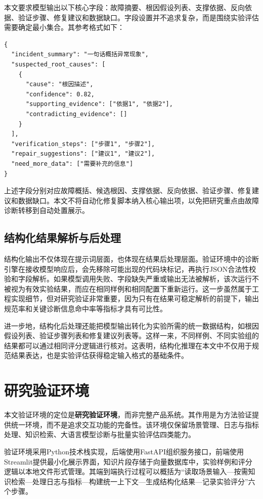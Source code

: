 本文要求模型输出以下核心字段：故障摘要、根因假设列表、支撑依据、反向依据、验证步骤、修复建议和数据缺口。字段设置并不追求复杂，而是围绕实验评估需要确定最小集合。其参考格式如下：

\begin{verbatim}
{
  "incident_summary": "一句话概括异常现象",
  "suspected_root_causes": [
    {
      "cause": "根因描述",
      "confidence": 0.82,
      "supporting_evidence": ["依据1", "依据2"],
      "contradicting_evidence": []
    }
  ],
  "verification_steps": ["步骤1", "步骤2"],
  "repair_suggestions": ["建议1", "建议2"],
  "need_more_data": ["需要补充的信息"]
}
\end{verbatim}

\noindent 上述字段分别对应故障概括、候选根因、支撑依据、反向依据、验证步骤、修复建议和数据缺口。本文不将自动化修复脚本纳入核心输出项，以免把研究重点由故障诊断转移到自动处置展示。

\subsection{结构化结果解析与后处理}

结构化输出不仅体现在提示词层面，也体现在结果后处理层面。验证环境中的诊断引擎在接收模型响应后，会先移除可能出现的代码块标记，再执行JSON合法性校验和字段解析。如果模型调用失败、字段缺失严重或输出无法被解析，该次运行不被视为有效实验结果，而应在相同样例和相同配置下重新运行。这一步虽然属于工程实现细节，但对研究验证非常重要，因为只有在结果可稳定解析的前提下，输出规范率和关键诊断信息命中率等指标才具有可比性。

进一步地，结构化后处理还能把模型输出转化为实验所需的统一数据结构，如根因假设列表、验证步骤列表和修复建议列表等。这样一来，不同样例、不同实验组的结果都可以通过相同评分逻辑进行核对。这表明，结构化推理在本文中不仅用于规范结果表达，也是实验评估获得稳定输入格式的基础条件。

\section{研究验证环境}

本文验证环境的定位是\textbf{研究验证环境}，而非完整产品系统。其作用是为方法验证提供统一环境，而不是追求交互功能的完备性。该环境仅保留场景管理、日志与指标处理、知识检索、大语言模型诊断与批量实验评估四类能力。

验证环境采用Python技术栈实现，后端使用FastAPI组织服务接口，前端使用Streamlit提供最小化展示界面，知识片段存储于向量数据库中，实验样例和评分逻辑以本地文件形式管理。其端到端执行过程可以概括为“读取场景输入—按需知识检索—处理日志与指标—构建统一上下文—生成结构化结果—记录实验评分”六个步骤。

